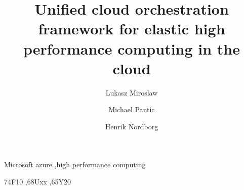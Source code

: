 \documentclass[3p,times]{elsarticle}
\begin{document}
\begin{frontmatter}




\title{Unified cloud orchestration framework for elastic high performance computing in the cloud}



\author[hsr,pwr]{Lukasz Miroslaw}
\author[hsr]{Michael Pantic}
\author[hsr]{Henrik Nordborg}

\address[hsr]{Institute for Energy Technology, Hochschule Rapperswil, Switzerland}
\address[pwr]{Wroclaw University of Technology, Poland}

\begin{abstract}



\end{abstract}

\begin{keyword}
Microsoft azure \sep high performance computing


\MSC[2010] 74F10 \sep 68Uxx	\sep 65Y20

\end{keyword}

\end{frontmatter}
\end{document}
